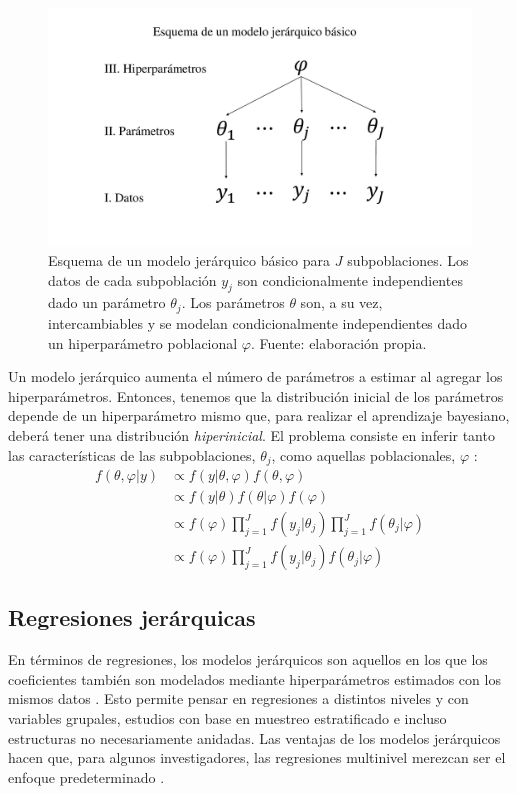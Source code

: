 \begin{figure}[h]
	\centering
	\includegraphics[scale=0.25]{Figs/Bayes/Modelo_Jer}
	\caption{Esquema de un modelo jerárquico básico para $J$ subpoblaciones. Los datos de cada subpoblación $y_j$ son condicionalmente independientes dado un parámetro $\theta_j$. Los parámetros $\theta$ son, a su vez, intercambiables y se modelan condicionalmente independientes dado un hiperparámetro poblacional $\varphi$. Fuente: elaboración propia.}
	\label{fig:Esquema_Modelo_Jer}	
\end{figure}

Un modelo jerárquico aumenta el número de parámetros a estimar al agregar los hiperparámetros. Entonces, tenemos que la distribución inicial de los parámetros depende de un hiperparámetro mismo que, para realizar el aprendizaje bayesiano, deberá tener una distribución \textit{hiperinicial}. El problema consiste en inferir tanto las características de las subpoblaciones, $\theta_j$, como aquellas poblacionales, $\varphi$ \parencite{GP98}: 
\begin{align*}
f(\theta,\varphi|y) & \propto f(y|\theta,\varphi)f(\theta,\varphi) \\
&\propto f(y|\theta)f(\theta|\varphi)f(\varphi) \\
&\propto f(\varphi)\prod\limits_{j=1}^Jf(y_j|\theta_j)\prod\limits_{j=1}^Jf(\theta_j|\varphi) \\
&\propto f(\varphi)\prod\limits_{j=1}^Jf(y_j|\theta_j)f(\theta_j|\varphi)
\end{align*}

\subsection{Regresiones jerárquicas}

En términos de regresiones, los modelos jerárquicos son aquellos en los que los coeficientes también son modelados mediante hiperparámetros estimados con los mismos datos \parencite{GelmanHill06}. Esto permite pensar en regresiones a distintos niveles y con variables grupales, estudios con base en muestreo estratificado e incluso estructuras no necesariamente anidadas. Las ventajas de los modelos jerárquicos hacen que, para algunos investigadores, las regresiones multinivel merezcan ser el enfoque predeterminado \parencite{McElreath15}.\\

